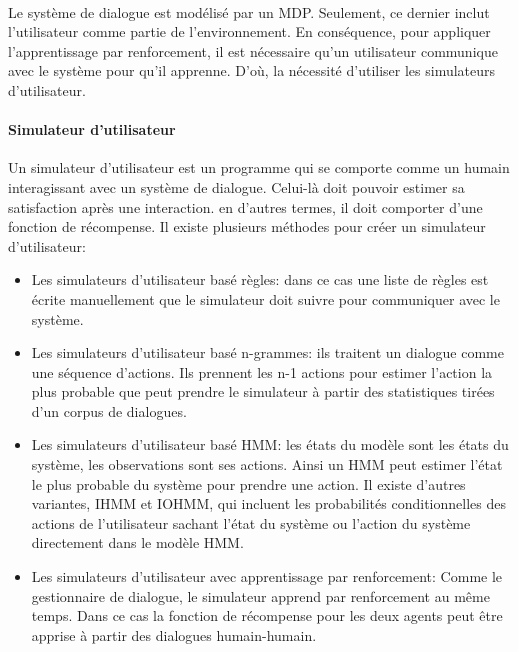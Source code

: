 \paragraph{}
Le système de dialogue est modélisé par un MDP. Seulement, ce dernier inclut l’utilisateur comme partie de l’environnement. En conséquence, pour appliquer l’apprentissage par renforcement, il est nécessaire qu’un utilisateur communique avec le système pour qu’il apprenne. D’où, la nécessité d’utiliser les simulateurs d’utilisateur.

\paragraph{Simulateur d'utilisateur}\label{usersim}
Un simulateur d’utilisateur est un programme qui se comporte comme un humain interagissant avec un système de dialogue. Celui-là doit pouvoir estimer sa satisfaction après une interaction. en d’autres termes, il doit comporter d'une fonction de récompense. Il existe plusieurs méthodes pour créer un simulateur d’utilisateur:
\begin{itemize}
	\item Les simulateurs d’utilisateur basé règles: dans ce cas une liste de règles est écrite manuellement que le simulateur doit suivre pour communiquer avec le système\cite{Schatzmann2007}.
	\item Les simulateurs d’utilisateur basé n-grammes: ils traitent un dialogue comme une séquence d’actions. Ils prennent les n-1 actions pour estimer l’action la plus probable que peut prendre le simulateur à partir des statistiques tirées d'un	 corpus de dialogues\cite{Georgila2005}.
	\item Les simulateurs d’utilisateur basé HMM: les états du modèle sont les états du système, les observations sont ses actions. Ainsi un HMM peut estimer l’état le plus probable du système pour prendre une action. Il existe d’autres variantes, IHMM et IOHMM, qui incluent les probabilités conditionnelles des actions de l'utilisateur sachant l’état du système ou l’action du système directement dans le modèle HMM\cite{Cuayhuitl2005}.
	\item Les simulateurs d’utilisateur avec apprentissage par renforcement: Comme le gestionnaire de dialogue, le simulateur apprend par renforcement au même temps. Dans ce cas la fonction de récompense pour les deux agents peut être apprise à partir des dialogues humain-humain\cite{Chandramohan2011}.
\end{itemize}







